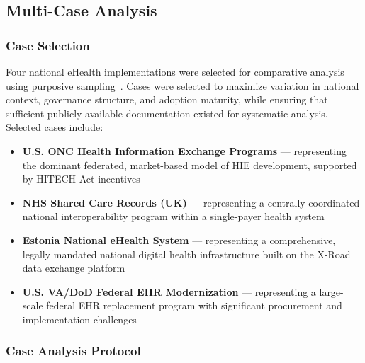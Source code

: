 \subsection{Multi-Case Analysis}

\subsubsection{Case Selection}

Four national eHealth implementations were selected for comparative analysis using purposive sampling~\cite{yin2018casestudy,patton2015qualitative,adams2020strategies}. Cases were selected to maximize variation in national context, governance structure, and adoption maturity, while ensuring that sufficient publicly available documentation existed for systematic analysis. Selected cases include:

\begin{itemize}
    \item \textbf{U.S. ONC Health Information Exchange Programs} — representing the dominant federated, market-based model of HIE development, supported by HITECH Act incentives~\cite{onc2025reports}
    \item \textbf{NHS Shared Care Records (UK)} — representing a centrally coordinated national interoperability program within a single-payer health system~\cite{nhs2025sharedcare}
    \item \textbf{Estonia National eHealth System} — representing a comprehensive, legally mandated national digital health infrastructure built on the X-Road data exchange platform~\cite{estonia2026ehealth}
    \item \textbf{U.S. VA/DoD Federal EHR Modernization} — representing a large-scale federal EHR replacement program with significant procurement and implementation challenges~\cite{gao2025vaehr,gao2024dodehr}
\end{itemize}

\subsubsection{Case Analysis Protocol}

